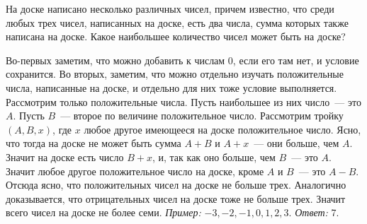 \problem
{}
На доске написано несколько различных чисел, причем известно, что среди любых
трех чисел, написанных на доске, есть два числа, сумма которых также написана
на доске.
Какое наибольшее количество чисел может быть на доске?

\solution
Во-первых заметим, что можно добавить к числам 0, если его там нет,
и условие сохранится.
Во вторых, заметим, что можно отдельно изучать положительные числа,
написанные на доске, и отдельно для них тоже условие выполняется.
Рассмотрим только положительные числа.
Пусть наибольшее из них число~--- это $A$.
Пусть $B$~--- второе по величине положительное число.
Рассмотрим тройку $(A, B, x)$, где $x$ любое другое имеющееся на доске
положительное число.
Ясно, что тогда на доске не может быть сумма $A + B$ и $A + x$~--- они больше,
чем $A$.
Значит на доске есть число $B + x$, и, так как оно больше, чем $B$~--- это $A$.
Значит любое другое положительное число на доске, кроме $A$ и $B$~---
это $A - B$.
Отсюда ясно, что положительных чисел на доске не больше трех.
Аналогично доказывается, что отрицательных чисел на доске тоже не больше трех.
Значит всего чисел на доске не более семи.
\emph{Пример:} $-3, -2, -1, 0, 1, 2, 3$.
\emph{Ответ:} 7.

\endproblem
